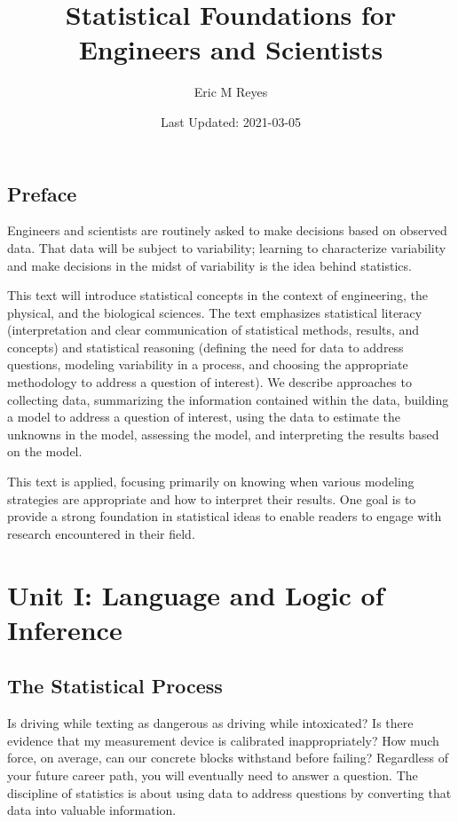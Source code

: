 \documentclass[
]{book}
\title{Statistical Foundations for Engineers and Scientists}
\author{Eric M Reyes}
\date{Last Updated: 2021-03-05}
\theoremstyle{plain}
\theoremstyle{mydefn}
\theoremstyle{myexmpl}
\theoremstyle{remark}
\begin{document}
\maketitle

{
\setcounter{tocdepth}{1}
\tableofcontents
}
\hypertarget{preface}{%
\chapter*{Preface}\label{preface}}

Engineers and scientists are routinely asked to make decisions based on observed data. That data will be subject to variability; learning to characterize variability and make decisions in the midst of variability is the idea behind statistics.

This text will introduce statistical concepts in the context of engineering, the physical, and the biological sciences. The text emphasizes statistical literacy (interpretation and clear communication of statistical methods, results, and concepts) and statistical reasoning (defining the need for data to address questions, modeling variability in a process, and choosing the appropriate methodology to address a question of interest). We describe approaches to collecting data, summarizing the information contained within the data, building a model to address a question of interest, using the data to estimate the unknowns in the model, assessing the model, and interpreting the results based on the model.

This text is applied, focusing primarily on knowing when various modeling strategies are appropriate and how to interpret their results. One goal is to provide a strong foundation in statistical ideas to enable readers to engage with research encountered in their field.

\hypertarget{part-unit-i-language-and-logic-of-inference}{%
\part{Unit I: Language and Logic of Inference}\label{part-unit-i-language-and-logic-of-inference}}

\hypertarget{Basics}{%
\chapter{The Statistical Process}\label{Basics}}

Is driving while texting as dangerous as driving while intoxicated? Is there evidence that my measurement device is calibrated inappropriately? How much force, on average, can our concrete blocks withstand before failing? Regardless of your future career path, you will eventually need to answer a question. The discipline of statistics is about using data to address questions by converting that data into valuable information.
\end{document}
